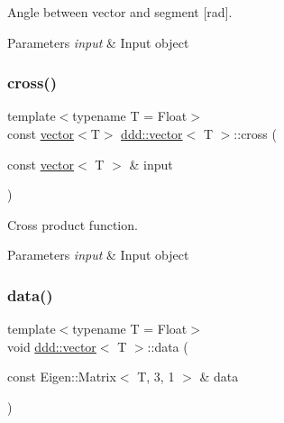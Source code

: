 Angle between vector and segment \mbox{[}rad\mbox{]}. 


\begin{DoxyParams}{Parameters}
{\em input} & Input object \\
\hline
\end{DoxyParams}
\mbox{\label{classddd_1_1vector_a27ac4cb7a469642d497cfe070935ab4b}} 
\subsubsection{\texorpdfstring{cross()}{cross()}}
{\footnotesize\ttfamily template$<$typename T = Float$>$ \\
const \hyperlink{classddd_1_1vector}{vector}$<$T$>$ \hyperlink{classddd_1_1vector}{ddd\+::vector}$<$ T $>$\+::cross (\begin{DoxyParamCaption}\item[{const \hyperlink{classddd_1_1vector}{vector}$<$ T $>$ \&}]{input }\end{DoxyParamCaption})\hspace{0.3cm}{\ttfamily [inline]}}



Cross product function. 


\begin{DoxyParams}{Parameters}
{\em input} & Input object \\
\hline
\end{DoxyParams}
\mbox{\label{classddd_1_1vector_a207ab0fdad2166078057b772edce8d0e}} 
\subsubsection{\texorpdfstring{data()}{data()}}
{\footnotesize\ttfamily template$<$typename T = Float$>$ \\
void \hyperlink{classddd_1_1vector}{ddd\+::vector}$<$ T $>$\+::data (\begin{DoxyParamCaption}\item[{const Eigen\+::\+Matrix$<$ T, 3, 1 $>$ \&}]{data }\end{DoxyParamCaption})\hspace{0.3cm}{\ttfamily [inline]}}



